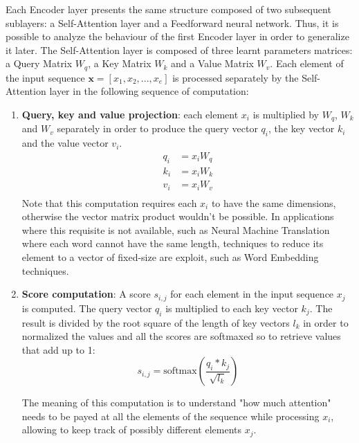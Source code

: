                 Each Encoder layer presents the same structure composed of two subsequent sublayers: a Self-Attention layer and a Feedforward neural network. Thus, it is possible to analyze the behaviour of the first Encoder layer in order to generalize it later. \newline
                The Self-Attention layer is composed of three learnt parameters matrices: a Query Matrix $W_q$, a Key Matrix $W_k$ and a Value Matrix $W_v$. Each element of the input sequence $\mathbf{x} = [x_1, x_2, ..., x_e]$ is processed separately by the Self-Attention layer in the following sequence of computation:
                \begin{enumerate}
                    \item \textbf{Query, key and value projection}: each element $x_i$ is multiplied by $W_q$, $W_k$ and $W_v$ separately in order to produce the query vector $q_i$, the key vector $k_i$ and the value vector $v_i$.
                    \begin{align*} 
                        q_i &= x_i W_q\\
                        k_i &= x_i W_k\\
                        v_i &= x_i W_v\\
                    \end{align*}
                    Note that this computation requires each $x_i$ to have the same dimensions, otherwise the vector matrix product wouldn't be possible. In applications where this requisite is not available, such as Neural Machine Translation where each word cannot have the same length, techniques to reduce its element to a vector of fixed-size are exploit, such as Word Embedding techniques.
                    
                    \item \textbf{Score computation}: A score $s_{i, j}$ for each element in the input sequence $x_j$ is computed. The query vector $q_i$ is multiplied to each key vector $k_j$. The result is divided by the root square of the length of key vectors $l_k$ in order to normalized the values and all the scores are softmaxed so to retrieve values that add up to 1:
                    \[ s_{i,j} = \text{softmax} \left( \frac{q_i * k_j}{\sqrt{l_k}} \right) \]
                    
                    The meaning of this computation is to understand "how much attention" needs to be payed at all the elements of the sequence while processing $x_i$, allowing to keep track of possibly different elements $x_j$.
                    

\end{enumerate}
